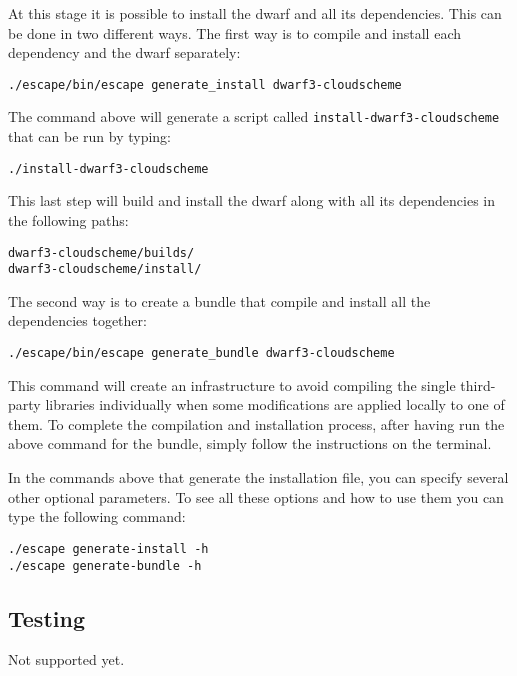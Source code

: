 \documentclass[
a4paper,     %
12pt,        %
article,
onecolumn,   %
openany,     %
]{memoir}
\newcommand{\inlsh}[1]{\texttt{#1}}
\newcommand{\inlsh}[1]{\tikz[anchor=base,baseline]\node[inner sep=2pt,
outer sep=0,draw=yellow!10,fill=yellow!10]{\texttt{#1}};}
\begin{document}
At this stage it is possible to install the dwarf 
and all its dependencies. This can be done in two 
different ways. The first way is to compile and 
install each dependency and the dwarf separately:
%
\begin{lstlisting}[style=BashStyle]
./escape/bin/escape generate_install dwarf3-cloudscheme
\end{lstlisting}
% 
The command above will generate a script 
called \inlsh{install-dwarf3-cloudscheme} 
that can be run by typing:
%
\begin{lstlisting}[style=BashStyle]
./install-dwarf3-cloudscheme
\end{lstlisting}
%
This last step will build and install the dwarf 
along with all its dependencies in the following 
paths:
%
\begin{lstlisting}[style=BashStyle]
dwarf3-cloudscheme/builds/
dwarf3-cloudscheme/install/
\end{lstlisting}
%

The second way is to create a bundle that compile 
and install all the dependencies together:
%
\begin{lstlisting}[style=BashStyle]
./escape/bin/escape generate_bundle dwarf3-cloudscheme
\end{lstlisting}
% 
This command will create an infrastructure to avoid
compiling the single third-party libraries individually
when some modifications are applied locally to one of 
them. To complete the compilation and installation process, 
after having run the above command for the bundle, simply 
follow the instructions on the terminal.

In the commands above that generate the installation 
file, you can specify several other optional parameters. 
To see all these options and how to use them you 
can type the following command:
%
\begin{lstlisting}[style=BashStyle]
./escape generate-install -h
./escape generate-bundle -h
\end{lstlisting}
%

\subsection{Testing}
Not supported yet.

\end{document}
